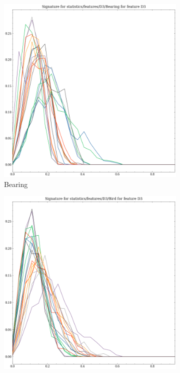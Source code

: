 \begin{figure}[t!p]
    \begin{subfigure}[b]{0.23\textwidth}
        \includegraphics[width=\textwidth]{assets/feature_extraction/D3/Bearing.png}
        \caption{Bearing}
    \end{subfigure}
    \hfill
    \begin{subfigure}[b]{0.23\textwidth}
        \includegraphics[width=\textwidth]{assets/feature_extraction/D3/Bird.png}

\end{subfigure}
\end{figure}
